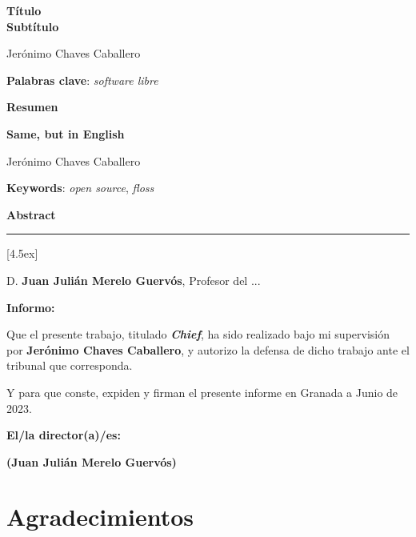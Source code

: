 \thispagestyle{empty}

\begin{center}
{\large\bfseries Título \\ Subtítulo }\\
\end{center}
\begin{center}
Jerónimo Chaves Caballero\\
\end{center}


\vspace{0.5cm}
\noindent\textbf{Palabras clave}: \textit{software libre}
\vspace{0.7cm}

\noindent\textbf{Resumen}
	

\cleardoublepage

\begin{center}
	{\large\bfseries Same, but in English}\\
\end{center}
\begin{center}
	Jerónimo Chaves Caballero\\
\end{center}
\vspace{0.5cm}
\noindent\textbf{Keywords}: \textit{open source}, \textit{floss}
\vspace{0.7cm}

\noindent\textbf{Abstract}


\cleardoublepage

\thispagestyle{empty}

\noindent\rule[-1ex]{\textwidth}{2pt}[4.5ex]

D. \textbf{Juan Julián Merelo Guervós}, Profesor del ...

\vspace{0.5cm}

\textbf{Informo:}

\vspace{0.5cm}

Que el presente trabajo, titulado \textit{\textbf{Chief}},
ha sido realizado bajo mi supervisión por \textbf{Jerónimo Chaves Caballero}, y autorizo la defensa de dicho trabajo ante el tribunal
que corresponda.

\vspace{0.5cm}

Y para que conste, expiden y firman el presente informe en Granada a Junio de 2023.

\vspace{1cm}

\textbf{El/la director(a)/es: }

\vspace{5cm}

\noindent \textbf{(Juan Julián Merelo Guervós)}

\chapter*{Agradecimientos}




